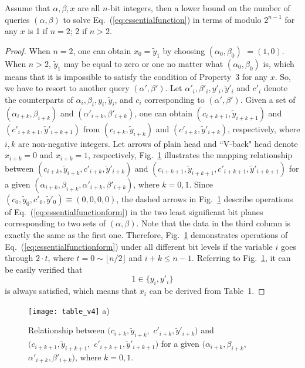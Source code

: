 \documentclass{ws-ijbc}
\newlength\figwidth
\begin{document}
\begin{proposition}
Assume that $\alpha, \beta, x$ are all $n$-bit integers, then a lower bound on the number of queries $(\alpha, \beta)$ to solve
Eq.~(\ref{eq:essentialfunction}) in terms of modulo $2^{n-1}$ for any $x$ is 1 if $n=2$; 2 if $n>2$.
\end{proposition}
\begin{proof}
When $n=2$, one can obtain $x_0=\tilde{y}_1$ by choosing $(\alpha_0, \beta_0)$ $=(1, 0)$.
When $n>2$, $\tilde{y}_1$ may be equal to zero or one no matter what $(\alpha_0, \beta_0)$ is, which means that
it is impossible to satisfy the condition of Property~3 for any $x$. So, we have to resort to another
query $(\alpha', \beta')$. Let $\alpha'_i, \beta'_i, y'_i, \tilde{y}'_{i}$ and $c'_i$ denote the counterparts of $\alpha_i, \beta_i, y_i, \tilde{y}_{i}$, and $c_i$
corresponding to $(\alpha', \beta')$. Given a set of $(\alpha_{i+k}, \beta_{i+k})$ and $(\alpha'_{i+k}, \beta'_{i+k})$, one can obtain
$(c_{i+k+1}, \tilde{y}_{i+k+1})$ and $(c'_{i+k+1}, \tilde{y}'_{i+k+1})$ from $(c_{i+k}, \tilde{y}_{i+k})$ and $(c'_{i+k}, \tilde{y}'_{i+k})$, respectively,
where $i, k$ are non-negative integers. Let arrows of plain head and ``V-back" head denote $x_{i+k}=0$ and $x_{i+k}=1$, respectively,
Fig.~\ref{fig:relationship} illustrates the mapping relationship between $(c_{i+k}, \tilde{y}_{i+k}, c'_{i+k}, \tilde{y}'_{i+k})$ and $(c_{i+k+1}, \tilde{y}_{i+k+1}, c'_{i+k+1}, \tilde{y}'_{i+k+1})$
for a given $(\alpha_{i+k}, \beta_{i+k}, \alpha'_{i+k}, \beta'_{i+k})$, where $k=0, 1$. Since $(c_{0}, \tilde{y}_{0}, c'_{0}, \tilde{y}'_{0})\equiv(0, 0, 0, 0)$,
the dashed arrows in Fig.~\ref{fig:relationship} describe operations of Eq.~(\ref{eq:essentialfunctionform}) in the two least significant bit planes corresponding to two sets of $(\alpha, \beta)$. Note that the data in the third column is exactly the same as the first one. Therefore, Fig.~\ref{fig:relationship} demonstrates operations of Eq.~(\ref{eq:essentialfunctionform})
under all different bit levels if the variable $i$ goes through $2\cdot t$, where $t=0\sim \lfloor n/2 \rfloor$ and $i+k\leq n-1$. Referring to Fig.~\ref{fig:relationship}, it can be
easily verified that $$1\in \{y_i, y'_i\}$$ is always satisfied, which means that $x_{i}$ can be derived from Table~1.
\end{proof}
\begin{figure}[!htb]
\centering
\begin{minipage}{1.5\figwidth}
\centering
\texttt{[image: table\_v4]}
a)
\end{minipage}
\caption{Relationship between $(c_{i+k}, \tilde{y}_{i+k},$ $c'_{i+k}, \tilde{y}'_{i+k})$ and $(c_{i+k+1}, \tilde{y}_{i+k+1},$ $c'_{i+k+1}, \tilde{y}'_{i+k+1})$ for
a given $(\alpha_{i+k},\beta_{i+k},$ $\alpha'_{i+k}, \beta'_{i+k})$, where $k=0, 1$.}
\label{fig:relationship}
\end{figure}
\end{document}
